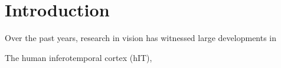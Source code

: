 

\section*{Introduction} 
Over the past years, research in vision has witnessed large developments in \lipsum[8-9]\cite{hung2005fast, kourtzi2011neural}

The human inferotemporal cortex (hIT),\lipsum[2]\cite{hung2005fast, kourtzi2011neural}

